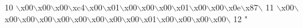 \begin{DoxyCode}
10 \textcolor{stringliteral}{\(\backslash\)x00\(\backslash\)x00\(\backslash\)x00\(\backslash\)xc4\(\backslash\)x00\(\backslash\)x01\(\backslash\)x00\(\backslash\)x00\(\backslash\)x00\(\backslash\)x01\(\backslash\)x00\(\backslash\)x00\(\backslash\)x0e\(\backslash\)x87\(\backslash\)}
11 \textcolor{stringliteral}{\(\backslash\)x00\(\backslash\)x00\(\backslash\)x00\(\backslash\)x00\(\backslash\)x00\(\backslash\)x00\(\backslash\)x00\(\backslash\)x00\(\backslash\)x00\(\backslash\)x01\(\backslash\)x00\(\backslash\)x00\(\backslash\)x00\(\backslash\)x00\(\backslash\)}
12 \textcolor{stringliteral}{"}
\end{DoxyCode}
